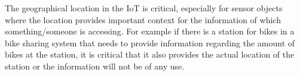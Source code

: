 The geographical location in the IoT is critical, especially for sensor objects where the location provides important context for the information of which something/someone is accessing\citep{misc:locationMatters}.
For example if there is a station for bikes in a bike sharing system that needs to provide information regarding the amount of bikes at the station, it is critical that it also provides the actual location of the station or the information will not be of any use.